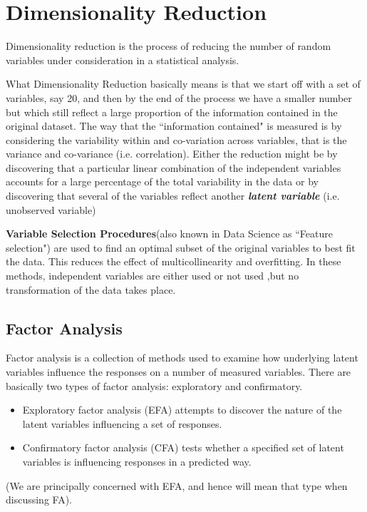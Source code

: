 \section{Dimensionality Reduction}

Dimensionality reduction is the process of reducing the number of random variables under consideration in a statistical analysis.

What Dimensionality Reduction basically means is that we start off with a set of variables, say 20, and then by the end of the process we have a smaller number but which still reflect a large proportion of the information contained in
the original dataset. The way that the ``information contained" is measured is by considering the variability within
and co-variation across variables, that is the variance and co-variance (i.e. correlation). Either the reduction might
be by discovering that a particular linear combination of the independent variables accounts for a large percentage of the total variability in the data or by discovering that several of the variables reflect another \textbf{\textit{latent variable}} (i.e. unobserved variable)


\textbf{Variable Selection Procedures}(also known in Data Science as ``Feature selection") are used to find an optimal subset of the original variables to best fit the data. This reduces the effect of multicollinearity and overfitting. In these methods, independent variables are either used or not used ,but no transformation of the data takes place.



\subsection{Factor Analysis}
Factor analysis is a collection of methods used to examine how underlying latent variables influence the
responses on a number of measured variables.
There are basically two types of factor analysis: exploratory and confirmatory.
\begin{itemize}
\item Exploratory factor analysis (EFA) attempts to discover the nature of the latent variables influencing
a set of responses.
\item Confirmatory factor analysis (CFA) tests whether a specified set of latent variables is influencing responses in a predicted way.
\end{itemize}
(We are principally concerned with EFA, and hence will mean that type when discussing FA).


